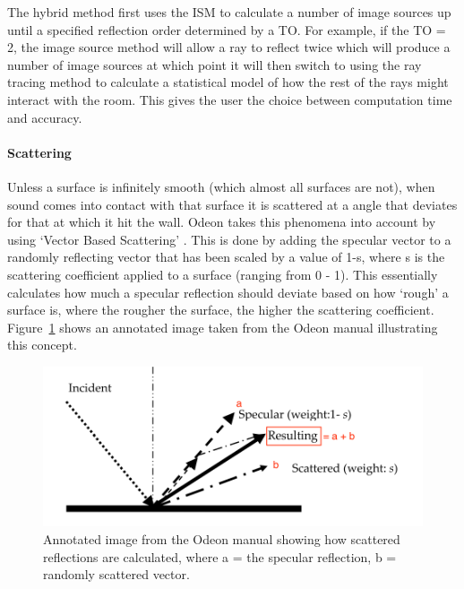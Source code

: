 \documentclass[../../main.tex]{subfiles}
\begin{document}
			The hybrid method first uses the \ac{ISM} to calculate a number of image sources up until a specified reflection order determined by a \ac{TO}. For example, if the \ac{TO} = 2, the image source method will allow a ray to reflect twice which will produce a number of image sources at which point it will then switch to using the ray tracing method to calculate a statistical model of how the rest of the rays might interact with the room. This gives the user the choice between computation time and accuracy.


		\paragraph{Scattering}
		\label{background:scattering}	

			Unless a surface is infinitely smooth (which almost all surfaces are not), when sound comes into contact with that surface it is scattered at a angle that deviates for that at which it hit the wall. Odeon takes this phenomena into account by using `Vector Based Scattering' \cite{odeonManual}. This is done by adding the specular vector to a randomly reflecting vector that has been scaled by a value of 1-s, where s is the scattering coefficient applied to a surface (ranging from 0 - 1). This essentially calculates how much a specular reflection should deviate based on how `rough' a surface is, where the rougher the surface, the higher the scattering coefficient. Figure~\ref{odeonScatterImage} shows an annotated image taken from the Odeon manual illustrating this concept.


			\begin{figure}[H]
				\center\includegraphics[scale = 1]{Sections/Background/images/scattering_edit.png}
				\caption{Annotated image from the Odeon manual \cite{odeonManual} showing how scattered reflections are calculated, where a = the specular reflection, b = randomly scattered vector.}
				\label{odeonScatterImage}
			\end{figure}
\end{document}
